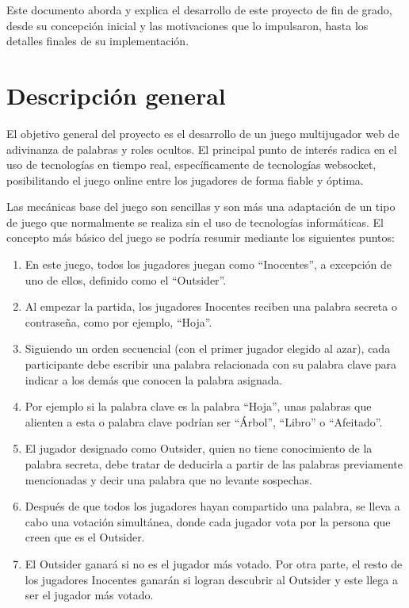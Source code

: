 Este documento aborda y explica el desarrollo de este proyecto de fin de grado,
desde su concepción inicial y las motivaciones que lo impulsaron, hasta los detalles
finales de su implementación.

\section{Descripción general}

El objetivo general del proyecto es el desarrollo de un juego multijugador web de adivinanza de palabras y roles ocultos. El principal punto de interés
radica en el uso de tecnologías en tiempo real, específicamente de tecnologías websocket, posibilitando el juego online entre los jugadores
de forma fiable y óptima.

Las mecánicas base del juego son sencillas y son más una adaptación de un tipo de juego que normalmente se realiza sin el uso de tecnologías informáticas.
El concepto más básico del juego se podría resumir mediante los siguientes puntos:

\begin{enumerate}
	\item En este juego, todos los jugadores juegan como ``Inocentes'', a excepción de uno de ellos,
	      definido como el ``Outsider''.
	\item Al empezar la partida, los jugadores
	      Inocentes reciben una
	      palabra secreta o contraseña, como por ejemplo, ``Hoja''.
	\item  Siguiendo un orden secuencial (con el primer jugador elegido al azar), cada
	      participante debe escribir una palabra relacionada con su palabra clave
	      para indicar a los demás que conocen la palabra asignada.
	\item Por ejemplo si la palabra clave es la palabra ``Hoja'', unas palabras que
	      alienten a esta  o palabra clave podrían ser ``Árbol'', ``Libro'' o ``Afeitado''.
	\item El jugador designado como Outsider, quien no tiene conocimiento de la palabra secreta, debe tratar de deducirla a partir de las palabras
	      previamente mencionadas y decir una palabra que no levante sospechas.
	\item Después de que todos los jugadores hayan compartido una palabra, se lleva a cabo una votación simultánea, donde cada jugador vota por la persona que creen
	      que es el Outsider.
	\item El Outsider ganará si no es el jugador más votado. Por otra parte, el resto de los jugadores Inocentes ganarán
	      si logran descubrir al Outsider y este llega a ser el jugador más votado.
\end{enumerate}

